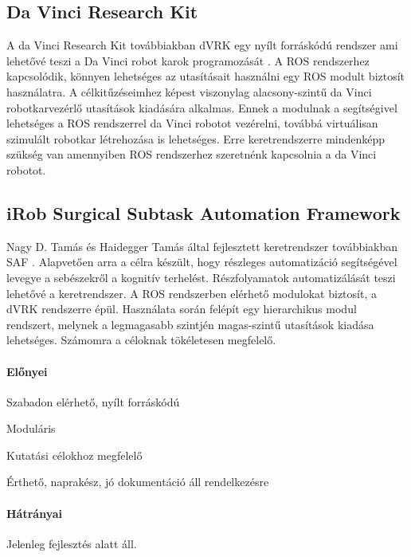 \documentclass[12pt,a4paper,oneside]{report} %
\begin{document}
\subsection{Da Vinci Research Kit}
\label{davinci}
A da Vinci Research Kit továbbiakban dVRK egy nyílt forráskódú rendszer ami lehetővé teszi a Da Vinci robot karok programozását \cite{kazanzides2014open}. A ROS rendszerhez kapcsolódik, könnyen lehetséges az utasításait használni egy ROS  modult biztosít használatra.  A célkitűzéseimhez képest viszonylag alacsony-szintű da Vinci robotkarvezérlő utasítások kiadására alkalmas.
Ennek a modulnak a segítségivel lehetséges a ROS rendszerrel da Vinci robotot vezérelni, továbbá virtuálisan szimulált robotkar létrehozása is lehetséges. Erre keretrendszerre mindenképp szükség van amennyiben ROS rendszerhez szeretnénk kapcsolnia a da Vinci robotot. 
\subsection{iRob Surgical Subtask Automation Framework}
\label{irob}
Nagy D. Tamás és Haidegger Tamás által fejlesztett keretrendszer továbbiakban SAF \cite{irobsaf2019}.
Alapvetően arra a célra készült, hogy részleges automatizáció segítségével levegye a sebészekről a kognitív terhelést. Részfolyamatok automatizálását teszi lehetővé a keretrendszer. A ROS rendszerben elérhető modulokat biztosít, a dVRK rendszerre épül. Használata során felépít egy hierarchikus modul rendszert, melynek a legmagasabb szintjén magas-szintű utasítások kiadása lehetséges. Számomra a céloknak tökéletesen megfelelő.
\paragraph{Előnyei} 
\begin{compactitem}
	\item Szabadon elérhető, nyílt forráskódú
	\item Moduláris
	\item Kutatási célokhoz megfelelő
	\item Érthető, naprakész, jó dokumentáció áll rendelkezésre
\end{compactitem}
\paragraph{Hátrányai} 
\begin{compactitem}
	\item Jelenleg fejlesztés alatt áll.
\end{compactitem}
\end{document}
